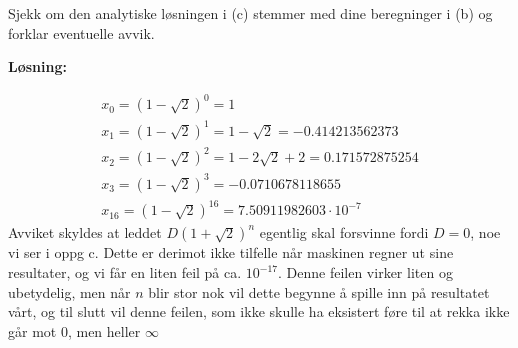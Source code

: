 \documentclass[11pt,norsk]{article}
\begin{document}
				\begin{flushleft}
Sjekk om den analytiske løsningen i (c) stemmer med dine beregninger i (b) og forklar eventuelle avvik.
				\begin{flushleft}
					\textbf{Løsning:}
				\end{flushleft}
					\begin{align}
x_0 = (1 - \sqrt{2})^0 = 1 \nonumber \\
x_1 = (1 - \sqrt{2})^1 = 1 - \sqrt{2} = -0.414213562373 \nonumber \\
x_2 = (1 - \sqrt{2})^2 = 1 - 2\sqrt{2} + 2 = 0.171572875254 \nonumber \\
x_3 = (1 - \sqrt{2})^3 = -0.0710678118655 \nonumber \\
x_{16} = (1 - \sqrt{2})^{16} = 7.50911982603 \cdot 10^{-7} \nonumber
					\end{align}
Avviket skyldes at leddet $D(1 + \sqrt{2})^n$ egentlig skal forsvinne fordi $D = 0$, noe vi ser i oppg c. Dette er derimot ikke tilfelle når maskinen regner ut sine resultater, og vi får en liten feil på ca. $10^{-17}$. Denne feilen virker liten og ubetydelig, men når $n$ blir stor nok vil dette begynne å spille inn på resultatet vårt, og til slutt vil denne feilen, som ikke skulle ha eksistert føre til at rekka ikke går mot $0$, men heller $\infty$
\vspace{3mm}
				\end{flushleft}
\end{document}
